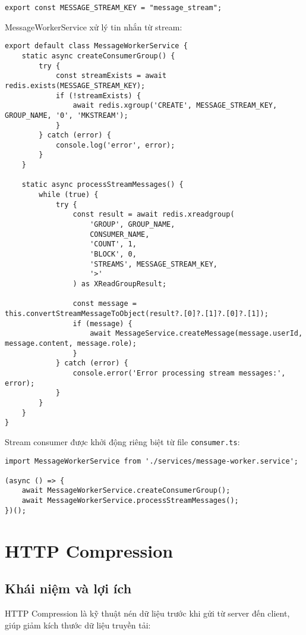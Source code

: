 \begin{verbatim}
export const MESSAGE_STREAM_KEY = "message_stream";
\end{verbatim}

MessageWorkerService xử lý tin nhắn từ stream:

\begin{verbatim}
export default class MessageWorkerService {
    static async createConsumerGroup() {
        try {
            const streamExists = await redis.exists(MESSAGE_STREAM_KEY);
            if (!streamExists) {
                await redis.xgroup('CREATE', MESSAGE_STREAM_KEY, GROUP_NAME, '0', 'MKSTREAM');
            }
        } catch (error) {
            console.log('error', error);
        }
    }

    static async processStreamMessages() {
        while (true) {
            try {
                const result = await redis.xreadgroup(
                    'GROUP', GROUP_NAME,
                    CONSUMER_NAME,
                    'COUNT', 1,
                    'BLOCK', 0,
                    'STREAMS', MESSAGE_STREAM_KEY,
                    '>'
                ) as XReadGroupResult;

                const message = this.convertStreamMessageToObject(result?.[0]?.[1]?.[0]?.[1]);
                if (message) {
                    await MessageService.createMessage(message.userId, message.content, message.role);
                }
            } catch (error) {
                console.error('Error processing stream messages:', error);
            }
        }
    }
}
\end{verbatim}

Stream consumer được khởi động riêng biệt từ file \texttt{consumer.ts}:

\begin{verbatim}
import MessageWorkerService from './services/message-worker.service';

(async () => {
    await MessageWorkerService.createConsumerGroup();
    await MessageWorkerService.processStreamMessages();
})();
\end{verbatim}

\section{HTTP Compression}

\subsection{Khái niệm và lợi ích}
HTTP Compression là kỹ thuật nén dữ liệu trước khi gửi từ server đến client, giúp giảm kích thước dữ liệu truyền tải:

